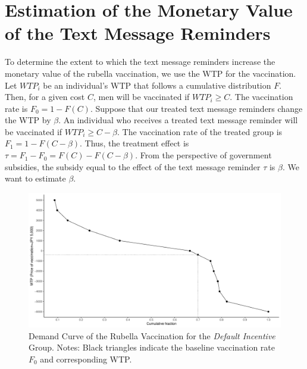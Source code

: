 \documentclass[
    a4paper
]{article}
\begin{document}
\clearpage

\hypertarget{method-value}{%
\section{Estimation of the Monetary Value of the Text Message Reminders}\label{method-value}}

To determine the extent to which the text message reminders increase the monetary value of the rubella vaccination, we use the WTP for the vaccination. Let \(WTP_i\) be an individual's WTP that follows a cumulative distribution \(F\). Then, for a given cost \(C\), men will be vaccinated if \(WTP_i \ge C\). The vaccination rate is \(F_0 = 1-F(C)\). Suppose that our treated text message reminders change the WTP by \(\beta\). An individual who receives a treated text message reminder will be vaccinated if \(WTP_i\ge C-\beta\). The vaccination rate of the treated group is \(F_1 = 1-F(C-\beta)\). Thus, the treatment effect is \(\tau = F_1-F_0=F(C)-F(C-\beta)\). From the perspective of government subsidies, the subsidy equal to the effect of the text message reminder \(\tau\) is \(\beta\). We want to estimate \(\beta\).

\begin{figure}[t]
\includegraphics{Supplementary-Material_files/figure-latex/demand-function-1} \caption{Demand Curve of the Rubella Vaccination for the \emph{Default Incentive} Group. Notes: Black triangles indicate the baseline vaccination rate $F_0$ and corresponding WTP.}\label{fig:demand-function}
\end{figure}
\end{document}
